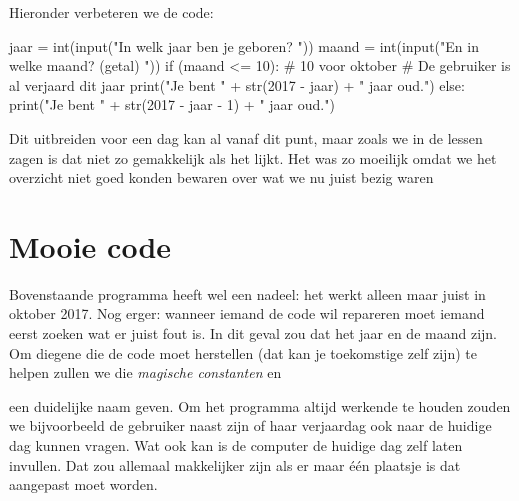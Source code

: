   Hieronder verbeteren we de code:
  \begin{python}
    jaar  = int(input("In welk jaar ben je geboren? "))
    maand = int(input("En in welke maand? (getal) "))
    if (maand <= 10): # 10 voor oktober
      # De gebruiker is al verjaard dit jaar
      print("Je bent " + str(2017 - jaar) + " jaar oud.")
    else:
      print("Je bent " + str(2017 - jaar - 1) + " jaar oud.")
  \end{python}
  Dit uitbreiden voor een dag kan al vanaf dit punt, maar zoals we in de lessen
  zagen is dat niet zo gemakkelijk als het lijkt. Het was zo moeilijk omdat we
  het overzicht niet goed konden bewaren over wat we nu juist bezig waren

\section{Mooie code}
  Bovenstaande programma heeft wel een nadeel: het werkt alleen maar juist in
  oktober 2017. Nog erger: wanneer iemand de code wil repareren moet iemand eerst
  zoeken wat er juist fout is. In dit geval zou dat het jaar en de maand zijn. Om
  diegene die de code moet herstellen (dat kan je toekomstige zelf zijn) te helpen
  zullen we die \emph{magische constanten}  en 
  een duidelijke naam geven. Om het programma altijd werkende te houden zouden we
  bijvoorbeeld de gebruiker naast zijn of haar verjaardag ook naar de huidige dag
  kunnen vragen. Wat ook kan is de computer de huidige dag zelf laten invullen.
  Dat zou allemaal makkelijker zijn als er maar \'e\'en plaatsje is dat aangepast
  moet worden.

